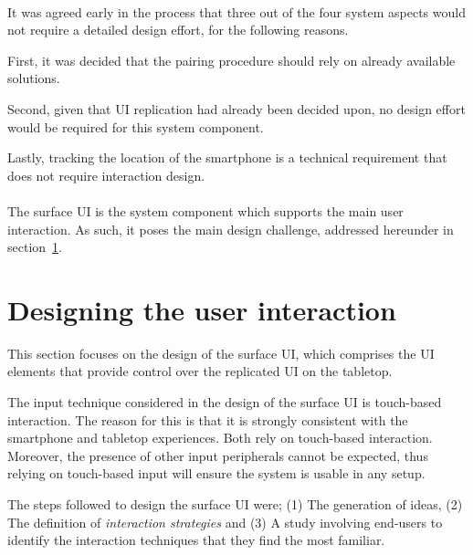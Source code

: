 \hfill\\
It was agreed early in the process that three out of the four system aspects would not require a detailed design effort, for the following reasons.

First, it was decided that the pairing procedure should rely on already available solutions.

Second, given that UI replication had already been decided upon, no design effort would be required for this system component.

Lastly, tracking the location of the smartphone is a technical requirement that does not require interaction design. %
\hfill\\
\hfill\\
The surface UI is the system component which supports the main user interaction.
As such, it poses the main design challenge, addressed hereunder in section~\ref{sec:interaction}.

\section{Designing the user interaction}
\label{sec:interaction}

This section focuses on the design of the surface UI, which comprises the UI elements that provide control over the replicated UI on the tabletop.

The input technique considered in the design of the surface UI is touch-based interaction.
The reason for this is that it is strongly consistent with the smartphone and tabletop experiences.
Both rely on touch-based interaction.
Moreover, the presence of other input peripherals cannot be expected, thus relying on touch-based input will ensure the system is usable in any setup.

The steps followed to design the surface UI were; (1) The generation of ideas, (2) The definition of \emph{interaction strategies} and (3) A study involving end-users to identify the interaction techniques that they find the most familiar.


